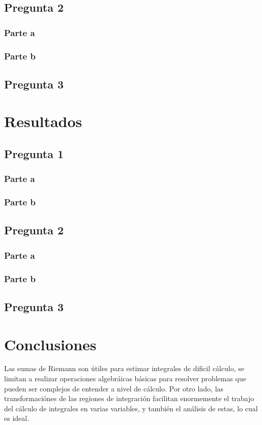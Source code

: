 \documentclass[12pt,letterpaper]{article}
\begin{document}
\subsection{Pregunta 2}
\subsubsection{Parte a}


\subsubsection{Parte b}

\subsection{Pregunta 3}


\section{Resultados}
\subsection{Pregunta 1}
\subsubsection{Parte a}

\subsubsection{Parte b}

\subsection{Pregunta 2}
\subsubsection{Parte a}


\subsubsection{Parte b}

\subsection{Pregunta 3}

\section{Conclusiones}
Las sumas de Riemann son útiles para estimar integrales de dificil cálculo, se limitan a realizar operaciones algebráicas básicas para resolver problemas que pueden ser complejos de entender a nivel de cálculo.
Por otro lado, las transformaciónes de las regiones de integración facilitan enormemente el trabajo del cálculo de integrales en varias variables, y también el análisis de estas, lo cual es ideal.


\end{document}
